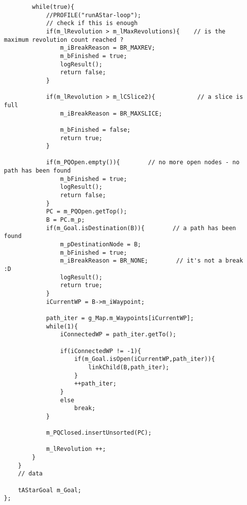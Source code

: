 \documentclass[12pt]{article}
\begin{document}
\begin{verbatim}
        while(true){
            //PROFILE("runAStar-loop");
            // check if this is enough
            if(m_lRevolution > m_lMaxRevolutions){    // is the maximum revolution count reached ?
                m_iBreakReason = BR_MAXREV;
                m_bFinished = true;
                logResult();
                return false;
            }

            if(m_lRevolution > m_lCSlice2){            // a slice is full
                m_iBreakReason = BR_MAXSLICE;

                m_bFinished = false;
                return true;
            }

            if(m_PQOpen.empty()){        // no more open nodes - no path has been found
                m_bFinished = true;
                logResult();
                return false;
            }
            PC = m_PQOpen.getTop();
            B = PC.m_p;
            if(m_Goal.isDestination(B)){        // a path has been found
                m_pDestinationNode = B;
                m_bFinished = true;
                m_iBreakReason = BR_NONE;        // it's not a break :D
                logResult();
                return true;
            }
            iCurrentWP = B->m_iWaypoint;

            path_iter = g_Map.m_Waypoints[iCurrentWP];
            while(1){
                iConnectedWP = path_iter.getTo();

                if(iConnectedWP != -1){
                    if(m_Goal.isOpen(iCurrentWP,path_iter)){
                        linkChild(B,path_iter);
                    }
                    ++path_iter;
                }
                else
                    break;
            }

            m_PQClosed.insertUnsorted(PC);

            m_lRevolution ++;
        }
    }
    // data
    
    tAStarGoal m_Goal;
};

\end{verbatim}
\linespread{1.3}
\normalsize
\end{document}
